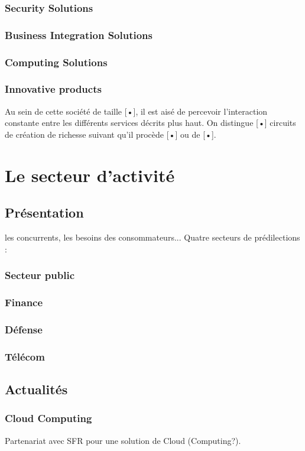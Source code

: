 \documentclass{article}
\begin{document}
		\subsubsection{Security Solutions}
		\subsubsection{Business Integration Solutions}
		\subsubsection{Computing Solutions}
		\subsubsection{Innovative products}
		Au sein de cette société de taille [•], il est aisé de percevoir l’interaction constante entre les différents 
		services décrits plus haut. On distingue [•] circuits de création de richesse suivant qu’il procède [•] ou de [•].
	\section{Le secteur d'activité}
		\subsection{Présentation}
		les concurrents, les besoins des consommateurs... \newline
		Quatre secteurs de prédilections : 
			\subsubsection{Secteur public}
			\subsubsection{Finance}
			\subsubsection{Défense}
			\subsubsection{Télécom}
		\subsection{Actualités}
			\subsubsection{Cloud Computing}
			Partenariat avec SFR pour une solution de Cloud (Computing?).
\end{document}
